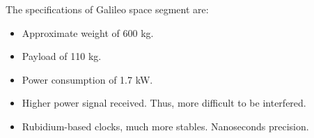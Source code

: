 \documentclass[../main.tex]{subfiles}
\begin{document}
The specifications of Galileo space segment are:
\begin{itemize}
	\item Approximate weight of 600 kg.
	\item Payload of 110 kg.
	\item Power consumption of 1.7 kW.
	\item Higher power signal received. Thus, more difficult to be interfered.
	\item Rubidium-based clocks, much more stables. Nanoseconds precision.
\end{itemize}
\end{document}
